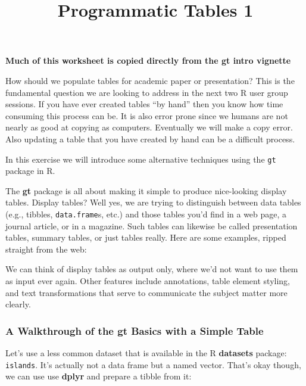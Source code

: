 \documentclass[]{article}
\title{Programmatic Tables 1}
\author{}
\date{}
\begin{document}
\maketitle

\textbf{Much of this worksheet is copied directly from the gt intro
vignette}

How should we populate tables for academic paper or presentation? This
is the fundamental question we are looking to address in the next two R
user group sessions. If you have ever created tables ``by hand'' then
you know how time consuming this process can be. It is also error prone
since we humans are not nearly as good at copying as computers.
Eventually we will make a copy error. Also updating a table that you
have created by hand can be a difficult process.

In this exercise we will introduce some alternative techniques using the
\texttt{gt} package in R.

The \textbf{gt} package is all about making it simple to produce
nice-looking display tables. Display tables? Well yes, we are trying to
distinguish between data tables (e.g., tibbles, \texttt{data.frame}s,
etc.) and those tables you'd find in a web page, a journal article, or
in a magazine. Such tables can likewise be called presentation tables,
summary tables, or just tables really. Here are some examples, ripped
straight from the web:

We can think of display tables as output only, where we'd not want to
use them as input ever again. Other features include annotations, table
element styling, and text transformations that serve to communicate the
subject matter more clearly.

\subsubsection{\texorpdfstring{A Walkthrough of the \textbf{gt} Basics
with a Simple
Table}{A Walkthrough of the gt Basics with a Simple Table}}\label{a-walkthrough-of-the-gt-basics-with-a-simple-table}

Let's use a less common dataset that is available in the R
\textbf{datasets} package: \texttt{islands}. It's actually not a data
frame but a named vector. That's okay though, we can use use
\textbf{dplyr} and prepare a tibble from it:
\end{document}
